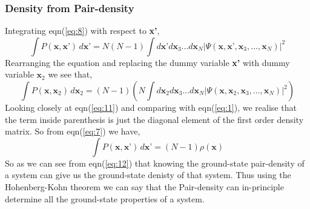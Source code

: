 \documentclass{article}
\begin{document}
\begin{Large}
\begin{flushleft}
  \subsubsection*{\Large{Density from Pair-density}}
  Integrating eqn(\ref{eq:8}) with respect to \textbf{x'},
  \begin{equation}\label{eq:10}
  \displaystyle{\int}P(\textbf{x},\textbf{x'})\,d\textbf{x'} = N(N-1)\displaystyle{\int}d\textbf{x'}d\textbf{x}_3...d\textbf{x}_N|\Psi(\textbf{x},\textbf{x'},\textbf{x}_3,...,\textbf{x}_N)|^2
  \end{equation}
  Rearranging the equation and replacing the dummy variable \textbf{x'} with dummy variable $\textbf{x}_2$ we see that,
  \begin{equation}\label{eq:11}
  \displaystyle{\int}P(\textbf{x},\textbf{x}_2)\,d\textbf{x}_2 = (N-1)\left(N\displaystyle{\int}d\textbf{x}_2d\textbf{x}_3...d\textbf{x}_N|\Psi(\textbf{x},\textbf{x}_2,\textbf{x}_3,...,\textbf{x}_N)|^2\right)
  \end{equation} 
  Looking closely at eqn(\ref{eq:11}) and comparing with eqn(\ref{eq:1}), we realise that the term inside parenthesis is just the diagonal element of the first order density matrix. So from eqn(\ref{eq:7}) we have,
  \begin{equation}\label{eq:12}
  \displaystyle{\int}P(\textbf{x},\textbf{x'})\,d\textbf{x'} = (N-1)\rho(\textbf{x})
  \end{equation} 
  So as we can see from eqn(\ref{eq:12}) that knowing the ground-state pair-density of a system can give us the ground-state denisty of that system. Thus using the Hohenberg-Kohn theorem we can say that the Pair-density can in-principle determine all the ground-state properties of a system.
  

\end{flushleft}
\end{Large}
\end{document}
